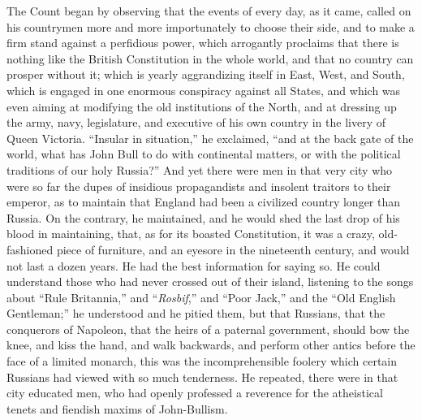 The Count began by observing that the events of every
day, as it came, called on his countrymen more and more
importunately to choose their side, and to make a firm
stand against a perfidious power, which arrogantly
proclaims that there is nothing like the British
Constitution in the whole world, and that no country can
prosper without it; which is yearly aggrandizing itself
in East, West, and South, which is engaged in one
enormous conspiracy against all States, and which was
even aiming at modifying the old institutions of the
North, and at dressing up the army, navy, legislature,
and executive of his own country in the livery of Queen
Victoria. ``Insular in situation,'' he exclaimed,
``and at the back gate of the world, what has John
Bull to do with continental matters, or with the
political traditions of our holy Russia?'' And yet
there were men in that very city who were so far the
dupes of insidious propagandists and insolent traitors to
their emperor, as to maintain that England had been a
civilized country longer than Russia. On the contrary, he
maintained, and he would shed the last drop of his blood
in maintaining, that, as for its boasted Constitution, it
was a crazy, old-fashioned piece of furniture, and an
eyesore in the nineteenth century, and would not last a
dozen years. He had the best information for saying so.
He could understand those who had never crossed out of
their island, listening to the songs about ``Rule
Britannia,'' and ``\emph{Rosbif},'' and
``Poor Jack,'' and the ``Old English
Gentleman;'' he understood and he pitied them, but
that Russians, that the conquerors of Napoleon, that the
heirs of a paternal government, should bow the knee, and
kiss the hand, and walk backwards, and perform other
antics before the face of a limited monarch, this was the
incomprehensible foolery which certain Russians had
viewed with so much tenderness. He repeated, there were
in that city educated men, who had openly professed a
reverence for the atheistical tenets and fiendish maxims
of John-Bullism.


